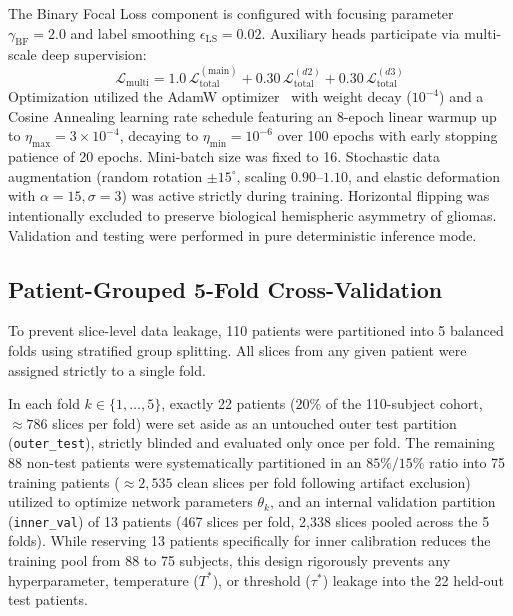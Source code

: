 \documentclass[preprint,3p,times,onecolumn]{elsarticle}
\begin{document}
The Binary Focal Loss component is configured with focusing parameter $\gamma_{\text{BF}} = 2.0$ and label smoothing $\epsilon_{\text{LS}} = 0.02$. Auxiliary heads participate via multi-scale deep supervision:
\begin{equation}
\mathcal{L}_{\text{multi}} = 1.0\,\mathcal{L}_{\text{total}}^{(\text{main})} + 0.30\,\mathcal{L}_{\text{total}}^{(d2)} + 0.30\,\mathcal{L}_{\text{total}}^{(d3)}
\end{equation}
Optimization utilized the AdamW optimizer~\cite{loshchilov2019decoupled} with weight decay ($10^{-4}$) and a Cosine Annealing learning rate schedule featuring an 8-epoch linear warmup up to $\eta_{\max} = 3 \times 10^{-4}$, decaying to $\eta_{\min} = 10^{-6}$ over 100 epochs with early stopping patience of 20 epochs. Mini-batch size was fixed to 16. Stochastic data augmentation (random rotation $\pm 15^\circ$, scaling $0.90$--$1.10$, and elastic deformation with $\alpha=15, \sigma=3$) was active strictly during training. Horizontal flipping was intentionally excluded to preserve biological hemispheric asymmetry of gliomas. Validation and testing were performed in pure deterministic inference mode.

\subsection{Patient-Grouped 5-Fold Cross-Validation}
To prevent slice-level data leakage, 110 patients were partitioned into 5 balanced folds using stratified group splitting. All slices from any given patient were assigned strictly to a single fold.

In each fold $k \in \{1, \dots, 5\}$, exactly 22 patients ($20\%$ of the 110-subject cohort, $\approx 786$ slices per fold) were set aside as an untouched outer test partition (\texttt{outer\_test}), strictly blinded and evaluated only once per fold. The remaining 88 non-test patients were systematically partitioned in an $85\% / 15\%$ ratio into 75 training patients ($\approx 2,535$ clean slices per fold following artifact exclusion) utilized to optimize network parameters $\theta_k$, and an internal validation partition (\texttt{inner\_val}) of 13 patients (467 slices per fold, 2,338 slices pooled across the 5 folds). While reserving 13 patients specifically for inner calibration reduces the training pool from 88 to 75 subjects, this design rigorously prevents any hyperparameter, temperature ($T^*$), or threshold ($\tau^*$) leakage into the 22 held-out test patients.
\end{document}
